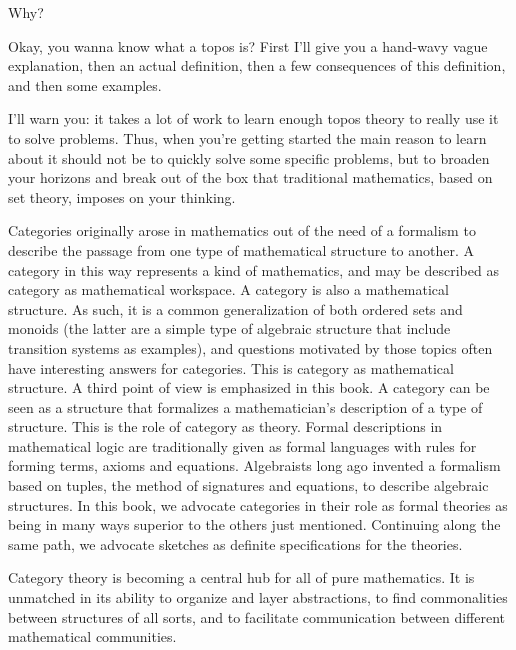 \begin{plSection}{Why?}
\begin{plQuote}
\end{plQuote}

\begin{plQuote}
{}
{}
Okay, you wanna know what a topos is? 
First I'll give you a hand-wavy vague explanation, 
then an actual definition, 
then a few consequences of this definition, 
and then some examples.
\par
I'll warn you: 
it takes a lot of work to learn enough topos theory 
to really use it to solve problems. 
Thus, when you're getting started the main reason to learn 
about it should not be to quickly solve some specific problems, 
but to broaden your horizons and break out of the box 
that traditional mathematics, based on set theory, 
imposes on your thinking.

\end{plQuote}

\begin{plQuote}
{}
{}
Categories originally arose in mathematics out of the need of a formalism to
describe the passage from one type of mathematical structure to another. A
category in this way represents a kind of mathematics, and may be described
as category as mathematical workspace.
A category is also a mathematical structure. As such, it is a common
generalization of both ordered sets and monoids (the latter are a simple
type of algebraic structure that include transition systems as examples),
and questions motivated by those topics often have interesting answers for
categories. This is category as mathematical structure.
A third point of view is emphasized in this book. A category can be seen
as a structure that formalizes a mathematician's description of a type of
structure. This is the role of category as theory. Formal descriptions in
mathematical logic are traditionally given as formal languages with rules for
forming terms, axioms and equations. Algebraists long ago invented a formalism
based on tuples, the method of signatures and equations, to describe
algebraic structures. In this book, we advocate categories in their role as formal
theories as being in many ways superior to the others just mentioned.
Continuing along the same path, we advocate sketches as definite specifications
for the theories.
\end{plQuote}

\begin{plQuote}
{}
{}
Category theory is becoming a central hub for all of pure mathematics. It is unmatched
in its ability to organize and layer abstractions, to find commonalities between structures
of all sorts, and to facilitate communication between different mathematical
communities.


\end{plQuote}
\end{plSection}
